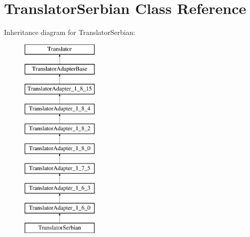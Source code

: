 \hypertarget{class_translator_serbian}{}\section{Translator\+Serbian Class Reference}
\label{class_translator_serbian}
Inheritance diagram for Translator\+Serbian\+:\begin{figure}[H]
\begin{center}
\leavevmode
\includegraphics[height=10.000000cm]{class_translator_serbian}
\end{center}
\end{figure}
